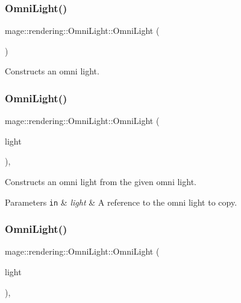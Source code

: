 \subsubsection{\texorpdfstring{Omni\+Light()}{OmniLight()}\hspace{0.1cm}{\footnotesize\ttfamily [1/3]}}
{\footnotesize\ttfamily mage\+::rendering\+::\+Omni\+Light\+::\+Omni\+Light (\begin{DoxyParamCaption}{ }\end{DoxyParamCaption})\hspace{0.3cm}{\ttfamily [noexcept]}}

Constructs an omni light. \hypertarget{classmage_1_1rendering_1_1_omni_light_adc27e555c730dbe8891e6ac4eb9d3900}{}\label{classmage_1_1rendering_1_1_omni_light_adc27e555c730dbe8891e6ac4eb9d3900} 
\subsubsection{\texorpdfstring{Omni\+Light()}{OmniLight()}\hspace{0.1cm}{\footnotesize\ttfamily [2/3]}}
{\footnotesize\ttfamily mage\+::rendering\+::\+Omni\+Light\+::\+Omni\+Light (\begin{DoxyParamCaption}\item[{const \hyperlink{classmage_1_1rendering_1_1_omni_light}{Omni\+Light} \&}]{light }\end{DoxyParamCaption})\hspace{0.3cm}{\ttfamily [default]}, {\ttfamily [noexcept]}}

Constructs an omni light from the given omni light.


\begin{DoxyParams}[1]{Parameters}
\mbox{\tt in}  & {\em light} & A reference to the omni light to copy. \\
\hline
\end{DoxyParams}
\hypertarget{classmage_1_1rendering_1_1_omni_light_a235afcf044e62a3f6672316eb8f3cd99}{}\label{classmage_1_1rendering_1_1_omni_light_a235afcf044e62a3f6672316eb8f3cd99} 
\subsubsection{\texorpdfstring{Omni\+Light()}{OmniLight()}\hspace{0.1cm}{\footnotesize\ttfamily [3/3]}}
{\footnotesize\ttfamily mage\+::rendering\+::\+Omni\+Light\+::\+Omni\+Light (\begin{DoxyParamCaption}\item[{\hyperlink{classmage_1_1rendering_1_1_omni_light}{Omni\+Light} \&\&}]{light }\end{DoxyParamCaption})\hspace{0.3cm}{\ttfamily [default]}, {\ttfamily [noexcept]}}


